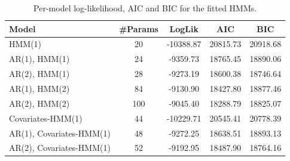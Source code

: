 \begin{table}[ht]
\centering
\begin{tabular}{lcccc}
\hline
Model & \#Params & LogLik & AIC & BIC \\
\hline
HMM(1) & 20 & -10388.87 & 20815.73 & 20918.68 \\
AR(1), HMM(1) & 24 & -9359.73 & 18765.45 & 18890.06 \\
AR(2), HMM(1) & 28 & -9273.19 & 18600.38 & 18746.64 \\
AR(1), HMM(2) & 84 & -9130.90 & 18427.80 & 18877.46 \\
AR(2), HMM(2) & 100 & -9045.40 & 18288.79 & 18825.07 \\
Covariates-HMM(1) & 44 & -10229.71 & 20545.41 & 20778.39 \\
AR(1), Covariates-HMM(1) & 48 & -9272.25 & 18638.51 & 18893.13 \\
AR(2), Covariates-HMM(1) & 52 & -9192.95 & 18487.90 & 18764.16 \\
\hline
\end{tabular}
\caption{Per-model log-likelihood, AIC and BIC for the fitted HMMs.}
\label{tab:model_stats}
\end{table}
